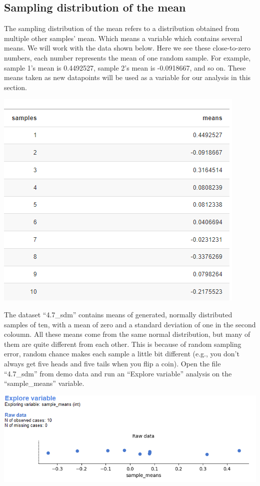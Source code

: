 \documentclass[
]{book}
\begin{document}
\hypertarget{sampling-distribution-of-the-mean}{%
\subsection{Sampling distribution of the mean}\label{sampling-distribution-of-the-mean}}

The sampling distribution of the mean refers to a distribution obtained from multiple other samples' mean. Which means a variable which contains several means. We will work with the data shown below. Here we see these close-to-zero numbers, each number represents the mean of one random sample. For example, sample 1's mean is 0.4492527, sample 2's mean is -0.0918667, and so on. These means taken as new datapoints will be used as a variable for our analysis in this section.

\includegraphics{img/ch4/4.6samplemeans.png}

The dataset ``4.7\_sdm'' contains means of generated, normally distributed samples of ten, with a mean of zero and a standard deviation of one in the second coloumn. All these means come from the same normal distribution, but many of them are quite different from each other. This is because of random sampling error, random chance makes each sample a little bit different (e.g., you don't always get five heads and five tails when you flip a coin). Open the file ``4.7\_sdm'' from demo data and run an ``Explore variable'' analysis on the ``sample\_means'' variable.

\includegraphics{img/ch4/4.6expvarsamplemeansRAW.png}
\end{document}
